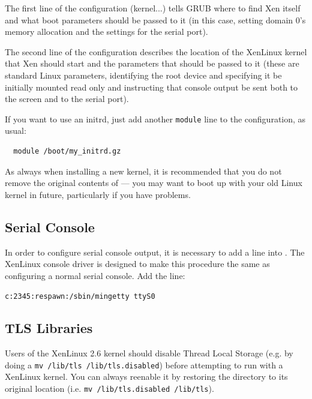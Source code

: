\documentclass[11pt,twoside,final,openright]{xenstyle}
\begin{document}
The first line of the configuration (kernel...) tells GRUB where to
find Xen itself and what boot parameters should be passed to it (in
this case, setting domain 0's memory allocation and the settings for
the serial port).

The second line of the configuration describes the location of the
XenLinux kernel that Xen should start and the parameters that should
be passed to it (these are standard Linux parameters, identifying the
root device and specifying it be initially mounted read only and
instructing that console output be sent both to the screen and to the
serial port).

If you want to use an initrd, just add another {\tt module} line to
the configuration, as usual:
\begin{verbatim}
  module /boot/my_initrd.gz
\end{verbatim}

As always when installing a new kernel, it is recommended that you do
not remove the original contents of  --- you may want
to boot up with your old Linux kernel in future, particularly if you
have problems.


\subsection{Serial Console}

In order to configure serial console output, it is necessary to add a
line into .  The XenLinux console driver is
designed to make this procedure the same as configuring a normal
serial console.  Add the line:

{\tt c:2345:respawn:/sbin/mingetty ttyS0}

\subsection{TLS Libraries}

Users of the XenLinux 2.6 kernel should disable Thread Local Storage
(e.g. by doing a {\tt mv /lib/tls /lib/tls.disabled}) before
attempting to run with a XenLinux kernel.  You can always reenable it
by restoring the directory to its original location (i.e. {\tt mv
  /lib/tls.disabled /lib/tls}).
\end{document}
